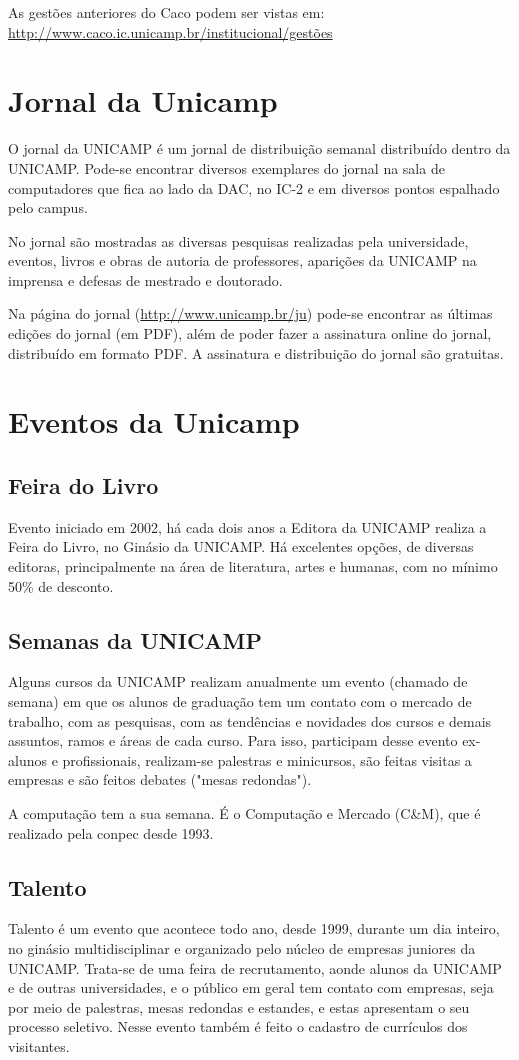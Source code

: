 As gestões anteriores do Caco podem ser vistas em:
\url{http://www.caco.ic.unicamp.br/institucional/gestões}

\section{Jornal da Unicamp}
O jornal da UNICAMP é um jornal de distribuição semanal distribuído dentro da
UNICAMP. Pode-se encontrar diversos exemplares do jornal na sala de computadores
que fica ao lado da DAC, no IC-2 e em diversos pontos espalhado pelo campus.

No jornal são mostradas as diversas pesquisas realizadas pela universidade,
eventos, livros e obras de autoria de professores, aparições da UNICAMP na
imprensa e defesas de mestrado e doutorado.

Na página do jornal (\url{http://www.unicamp.br/ju}) pode-se encontrar as
últimas edições do jornal (em PDF), além de poder fazer a assinatura online do
jornal, distribuído em formato PDF. A assinatura e distribuição do jornal são
gratuitas.

\section{Eventos da Unicamp}
\subsection{Feira do Livro}
Evento iniciado em 2002, há cada dois anos a Editora da UNICAMP realiza a Feira
do Livro, no Ginásio da UNICAMP. Há excelentes opções, de diversas editoras,
principalmente na área de literatura, artes e humanas, com no mínimo 50\% de
desconto.

\subsection{Semanas da UNICAMP}
Alguns cursos da UNICAMP realizam anualmente um evento (chamado de semana) em
que os alunos de graduação tem um contato com o mercado de trabalho, com as
pesquisas, com as tendências e novidades dos cursos e demais assuntos, ramos
e áreas de cada curso. Para isso, participam desse evento ex-alunos
e profissionais, realizam-se palestras e minicursos, são feitas visitas
a empresas e são feitos debates ("mesas redondas").

A computação tem a sua semana. É o Computação e Mercado (C\&M), que é realizado
pela conpec desde 1993.

\subsection{Talento}
Talento é um evento que acontece todo ano, desde 1999, durante um dia inteiro,
no ginásio multidisciplinar e organizado pelo núcleo de empresas juniores da
UNICAMP. Trata-se de uma feira de recrutamento, aonde alunos da UNICAMP e de
outras universidades, e o público em geral tem contato com empresas, seja por
meio de palestras, mesas redondas e estandes, e estas apresentam o seu processo
seletivo. Nesse evento também é feito o cadastro de currículos dos visitantes.

